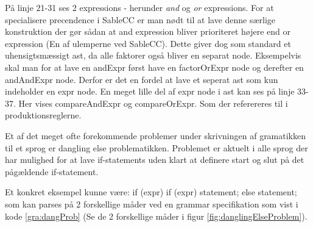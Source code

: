 På linje 21-31 ses 2 expressions - herunder \textit{and} og \textit{or} expressions. For at specialisere precendence i SableCC er man nødt til at lave denne særlige konstruktion der gør sådan at and expression bliver prioriteret højere end or expression (En af ulemperne ved SableCC). Dette giver dog som standard et uhensigtsmæssigt \gls{ast}, da alle faktorer også bliver en separat node. Eksempelvis skal man for at lave en andExpr først have en factorOrExpr node og derefter en andAndExpr node. Derfor er det en fordel at lave et seperat \gls{ast} som kun indeholder en expr node. En meget lille del af expr node i \gls{ast} kan ses på linje 33-37. Her vises compareAndExpr og compareOrExpr. Som der referereres til i produktionsreglerne.




\label{subsec:danglingelse}
Et af det meget ofte forekommende problemer under skrivningen af gramatikken til et sprog er dangling else problematikken. Problemet er aktuelt i alle sprog der har mulighed for at lave if-statements uden klart at definere start og slut på det pågældende if-statement.

Et konkret eksempel kunne være: if (expr) if (expr) statement; else statement; som kan parses på 2 forskellige måder ved en grammar specifikation som vist i kode \ref{gra:dangProb} (Se de 2 forskellige måder i figur \ref{fig:danglingElseProblem}).

